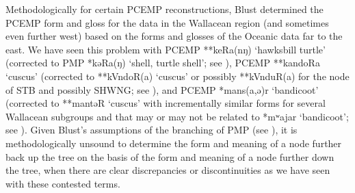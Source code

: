 Methodologically for certain PCEMP reconstructions,
Blust determined the PCEMP form
and gloss for the data in the Wallacean region (and sometimes
even further west) based on the forms
and glosses of the Oceanic data far to the east.
We have seen this problem with PCEMP **keRa(nŋ) ‘hawksbill turtle’
(corrected to PMP *kəRa(ŋ) ‘shell,
turtle shell’; see ),
PCEMP **kandoRa ‘cuscus’ (corrected to **kVndoR(a) ‘cuscus’ or
possibly **kVnduR(a) for the  node of STB
and possibly SHWNG; see ),
and PCEMP *mans(a,ə)r ‘bandicoot’ (corrected to **mantəR ‘cuscus’
with incrementally similar forms for several Wallacean subgroups
and  that may or may not be related to 
*mʷajar ‘bandicoot’; see ).
Given Blust’s assumptions of the branching of PMP (see ),
it is methodologically unsound to determine the form
and meaning of a node further back up the tree on the basis of
the form and meaning of a node further down the tree,
when there are clear discrepancies or discontinuities as we have
seen with these contested terms.
